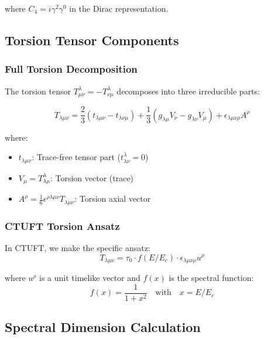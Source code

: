 where $C_4 = i\gamma^2\gamma^0$ in the Dirac representation.

\subsection{Torsion Tensor Components}

\subsubsection{Full Torsion Decomposition}

The torsion tensor $T^\lambda_{\mu\nu} = -T^\lambda_{\nu\mu}$ decomposes into three irreducible parts:

\begin{equation}
    T_{\lambda\mu\nu} = \frac{2}{3}(t_{\lambda\mu\nu} - t_{\lambda\nu\mu}) + \frac{1}{3}(g_{\lambda\mu}V_\nu - g_{\lambda\nu}V_\mu) + \epsilon_{\lambda\mu\nu\rho}A^\rho
\end{equation}

where:
\begin{itemize}
    \item $t_{\lambda\mu\nu}$: Trace-free tensor part ($t^\lambda_{\lambda\nu} = 0$)
    \item $V_\mu = T^\lambda_{\lambda\mu}$: Torsion vector (trace)
    \item $A^\rho = \frac{1}{6}\epsilon^{\rho\lambda\mu\nu}T_{\lambda\mu\nu}$: Torsion axial vector
\end{itemize}

\subsubsection{CTUFT Torsion Ansatz}

In CTUFT, we make the specific ansatz:
\begin{equation}
    T_{\lambda\mu\nu} = \tau_0 \cdot f(E/E_c) \cdot \epsilon_{\lambda\mu\nu\rho}u^\rho
\end{equation}

where $u^\rho$ is a unit timelike vector and $f(x)$ is the spectral function:
\begin{equation}
    f(x) = \frac{1}{1 + x^2} \quad \text{with} \quad x = E/E_c
\end{equation}

\subsection{Spectral Dimension Calculation}

